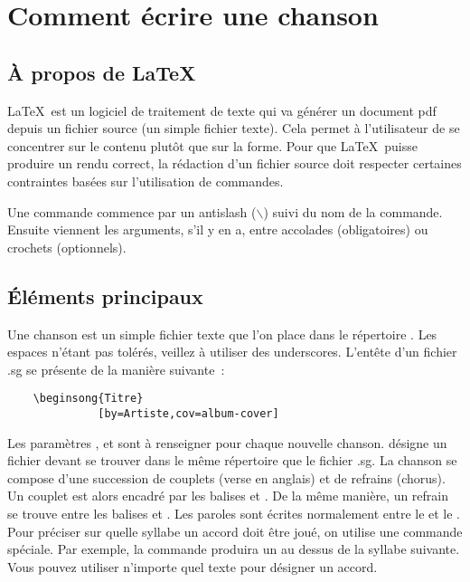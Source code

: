 \documentclass[online]{patacrep}
\begin{document}
\section{Comment écrire une chanson}

\subsection{À propos de \LaTeX\,}

\LaTeX\, est un logiciel de traitement de texte qui va générer un
document pdf depuis un fichier source (un simple fichier texte). Cela
permet à l'utilisateur de se concentrer sur le contenu plutôt que sur
la forme. Pour que \LaTeX\, puisse produire un rendu correct, la
rédaction d'un fichier source doit respecter certaines contraintes
basées sur l'utilisation de commandes.

Une commande commence par un antislash ($\backslash$) suivi du nom de
la commande. Ensuite viennent les arguments, s'il y en a, entre
accolades (obligatoires) ou crochets (optionnels).


\subsection{Éléments principaux}

Une chanson est un simple fichier texte  que l'on
place dans le répertoire . Les espaces n'étant
pas tolérés, veillez à utiliser des underscores. L'entête d'un fichier
.sg se présente de la manière suivante~:

\begin{verbatim}
    \beginsong{Titre}
              [by=Artiste,cov=album-cover]
\end{verbatim}

Les paramètres ,  et
 sont à renseigner pour chaque nouvelle
chanson.  désigne un fichier
 devant se trouver dans le même répertoire que
le fichier .sg.  La chanson se compose d'une succession de couplets
(verse en anglais) et de refrains (chorus). Un couplet est alors
encadré par les balises  et
. De la même manière, un refrain se trouve entre
les balises  et .  Les
paroles sont écrites normalement entre le  et le
. Pour préciser sur quelle syllabe un accord doit être
joué, on utilise une commande spéciale. Par exemple, la commande
\latexcom{[Mi]} produira un  au dessus de la syllabe
suivante. Vous pouvez utiliser n'importe quel texte pour désigner un
accord.
\end{document}
